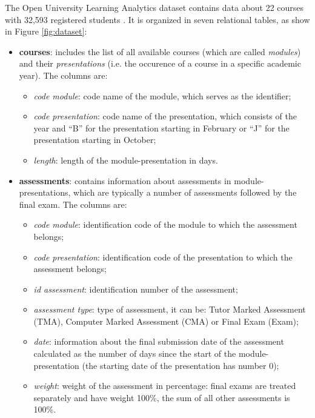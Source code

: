 \documentclass{article}
\begin{document}
The Open University Learning Analytics dataset contains data about 22 courses with 32,593 registered students \cite{dataset}. It is organized in seven relational tables, as show in Figure \ref{fig:dataset}:
\begin{itemize}
    \item \textbf{courses}: includes the list of all available courses (which are called \textit{modules}) and their \textit{presentations} (i.e. the occurence of a course in a specific academic year). The columns are:
    \begin{itemize}
        \item \textit{code module}: code name of the module, which serves as the identifier;
        \item \textit{code presentation}: code name of the presentation, which consists of the year and “B” for the presentation starting in February or “J” for the presentation starting in October;
        \item \textit{length}: length of the module-presentation in days.
    \end{itemize}

    \item \textbf{assessments}: contains information about assessments in module-presentations, which are typically a number of assessments followed by the final exam. The columns are:
    \begin{itemize}
        \item \textit{code module}: identification code of the module to which the assessment belongs;
        \item \textit{code presentation}: identification code of the presentation to which the assessment belongs;
        \item \textit{id assessment}: identification number of the assessment;
        \item \textit{assessment type}: type of assessment, it can be: Tutor Marked Assessment (TMA), Computer Marked Assessment (CMA) or Final Exam (Exam);
        \item \textit{date}: information about the final submission date of the assessment calculated as the number of days since the start of the module-presentation (the starting date of the presentation has number 0);
        \item \textit{weight}: weight of the assessment in percentage: final exams are treated separately and have weight 100\%, the sum of all other assessments is 100\%.  
    \end{itemize}
    

\end{itemize}
\end{document}
